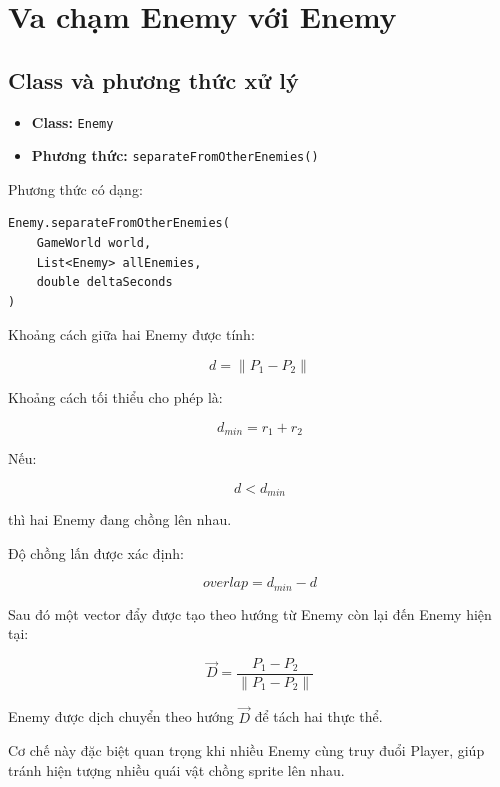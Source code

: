 \documentclass[12pt,a4paper]{report}
\begin{document}


    \section{Va chạm Enemy với Enemy}

    \subsection{Class và phương thức xử lý}

    \begin{itemize}
        \item \textbf{Class:} \texttt{Enemy}
        \item \textbf{Phương thức:}
        \texttt{separateFromOtherEnemies()}
    \end{itemize}

    Phương thức có dạng:

    \begin{verbatim}
Enemy.separateFromOtherEnemies(
    GameWorld world,
    List<Enemy> allEnemies,
    double deltaSeconds
)
    \end{verbatim}

    Khoảng cách giữa hai Enemy được tính:

    \[
        d = \left\|P_1-P_2\right\|
    \]

    Khoảng cách tối thiểu cho phép là:

    \[
        d_{min}=r_1+r_2
    \]

    Nếu:

    \[
        d < d_{min}
    \]

    thì hai Enemy đang chồng lên nhau.

    Độ chồng lấn được xác định:

    \[
        overlap=d_{min}-d
    \]

    Sau đó một vector đẩy được tạo theo hướng từ Enemy còn lại
    đến Enemy hiện tại:

    \[
        \vec{D}
        =
        \frac{P_1-P_2}
        {\left\|P_1-P_2\right\|}
    \]

    Enemy được dịch chuyển theo hướng $\vec{D}$ để tách hai thực thể.

    Cơ chế này đặc biệt quan trọng khi nhiều Enemy cùng truy đuổi
    Player, giúp tránh hiện tượng nhiều quái vật chồng sprite lên nhau.


\end{document}
